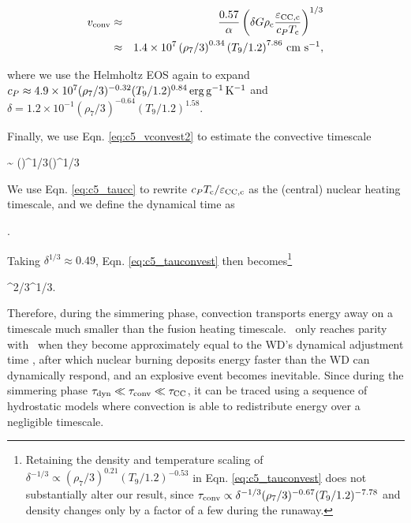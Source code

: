 \begin{eqnarray}
\vconv &\approx& \frac{0.57}{\alpha}\left(\delta G\rhoc\frac{\epscentral}{c_P \Tc}\right)^{1/3} \nonumber \\
&\approx& 1.4\times10^{7}\left(\rho_7/3\right)^{0.34}\left(T_9/1.2\right)^{7.86}\,\cmpsec,
\label{eq:c5_vconvest2}
\end{eqnarray}

\noindent where we use the Helmholtz EOS again to expand $c_P \approx 4.9\times10^7(\rho_7/3)^{-0.32}(T_9/1.2)^{0.84}\,\mathrm{erg}\,\mathrm{g}^{-1}\,\mathrm{K}^{-1}$ and $\delta = 1.2\times10^{-1}(\rho_7/3)^{-0.64}(T_9/1.2)^{1.58}$.

Finally, we use Eqn. \ref{eq:c5_vconvest2} to estimate the convective timescale

\eqbegin
\tauconv \sim {} \approx {}\left(\right)^{1/3}\left(\right)^{1/3}
\label{eq:c5_tauconvest}
\eqend

\noindent We use Eqn. \ref{eq:c5_taucc} to rewrite $c_P\Tc/\epscentral$ as the (central) nuclear heating timescale, and we define the dynamical time as

\eqbegin
\taudyn \equiv {}.
\label{eq:c5_taudyn}
\eqend


\noindent Taking $\delta^{1/3} \approx 0.49$, Eqn. \ref{eq:c5_tauconvest} then becomes\footnote{Retaining the density and temperature scaling of $\delta^{-1/3} \propto (\rho_7/3)^{0.21}(T_9/1.2)^{-0.53}$ in Eqn. \ref{eq:c5_tauconvest} does not substantially alter our result, since $\tauconv \propto \delta^{-1/3}(\rho_7/3)^{-0.67}(T_9/1.2)^{-7.78}$ and density changes only by a factor of a few during the runaway.}

\eqbegin
\tauconv {}\taudyn^{2/3}\taucc^{1/3}.
\label{eq:c5_tauconvest2}
\eqend

Therefore, during the simmering phase, convection transports energy away on a timescale much smaller than the fusion heating timescale.  \taucc\ only reaches parity with \tauconv\ when they become approximately equal to the WD's dynamical adjustment time \taudyn, after which nuclear burning deposits energy faster than the WD can dynamically respond, and an explosive event becomes inevitable.  Since during the simmering phase $\taudyn \ll \tauconv \ll \taucc$, it can be traced using a sequence of hydrostatic models where convection is able to redistribute energy over a negligible timescale.

